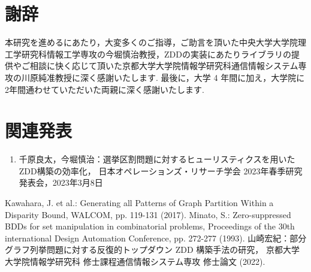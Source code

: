 \documentclass[10pt,a4paper,notitlepage,oneside,twocolumn]{abst_jsarticle}
\begin{document}
\section*{謝辞}
本研究を進めるにあたり，大変多くのご指導，ご助言を頂いた中央大学大学院理工学研究科情報工学専攻の今堀慎治教授，ZDDの実装にあたりライブラリの提供やご相談に快く応じて頂いた京都大学大学院情報学研究科通信情報システム専攻の川原純准教授に深く感謝いたします.
最後に，大学 4 年間に加え，大学院に2年間通わせていただいた両親に深く感謝いたします.

\section*{関連発表}
\begin{enumerate}
  \item 千原良太，今堀慎治：選挙区割問題に対するヒューリスティクスを用いたZDD構築の効率化，
  日本オペレーションズ・リサーチ学会 2023年春季研究発表会，2023年3月8日
\end{enumerate}

\begin{thebibliography}{9}
  Kawahara, J. et al.: Generating all Patterns of Graph Partition Within a Disparity Bound, WALCOM, pp. 119-131 (2017).
  Minato, S.: Zero-suppressed BDDs for set manipulation in combinatorial problems,
  Proceedings of the 30th international Design Automation Conference,
  pp. 272-277 (1993).
  山崎宏紀：部分グラフ列挙問題に対する反復的トップダウン ZDD 構築手法の研究，
  京都大学大学院情報学研究科 修士課程通信情報システム専攻 修士論文 (2022).

\end{thebibliography}
\end{document}
